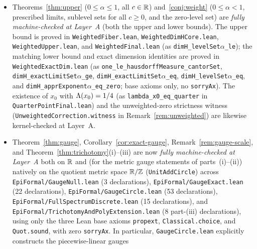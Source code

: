 \begin{itemize}[leftmargin=1.5em]
\texttt{EpiFormal/\allowbreak{}GaugeExact.lean}
(\texttt{volume\_finiteLevel\_zero}, \texttt{ae\_apprExponent\_eq\_top},
\texttt{volume\_infiniteLevel\_Icc}, and
\texttt{dimH\_infiniteLevel\_eq\_one}).
\item Theorems~\ref{thm:upper} ($0\le\alpha\le1$, all $c\in\mathbb{R}$)
and~\ref{conj:weight} ($0\le\alpha<1$, prescribed limits, sublevel sets for all
$c\ge0$, and the zero-level set) are \emph{fully machine-checked at Layer~A}
(both the upper and lower bounds). The upper bound is proved in
\texttt{Weighted\allowbreak Fiber.lean}, \texttt{Weighted\allowbreak DimHCore.lean},
\texttt{Weighted\allowbreak Upper.lean}, and \texttt{Weighted\allowbreak Final.lean}
(as \texttt{dimH\_\allowbreak levelSet\ensuremath{\alpha}\_le}); the
matching lower bound and exact dimension identities are proved in
\texttt{Weighted\allowbreak ExactDim.lean}
(as \texttt{one\_\allowbreak le\_\allowbreak hausdorff\allowbreak Measure\_\allowbreak cantorSet},
\texttt{dimH\_\allowbreak exact\allowbreak LimitSet\ensuremath{\alpha}\_ge},
\texttt{dimH\_\allowbreak exact\allowbreak LimitSet\ensuremath{\alpha}\_eq},
\texttt{dimH\_\allowbreak levelSet\ensuremath{\alpha}\_eq}, and
\texttt{dimH\_\allowbreak appr\allowbreak Exponent\ensuremath{\alpha}\_eq\_\allowbreak zero}; base
axioms only, no \texttt{sorryAx}). The existence of $x_0$ with $\Lambda(x_0)=1/4$
(as \texttt{lambda\_\allowbreak x0\_\allowbreak eq\_\allowbreak quarter} in \texttt{Quarter\allowbreak Point\allowbreak Final.lean}) and the
unweighted-zero strictness witness
(\texttt{Unweighted\allowbreak Correction.\allowbreak witness} in Remark~\ref{rem:unweighted})
are likewise kernel-checked at Layer~A.
\item Theorem~\ref{thm:gauge}, Corollary~\ref{cor:exact-gauge},
Remark~\ref{rem:gauge-scale}, and Theorem~\ref{thm:trichotomy}(i)--(iii) are now
\emph{fully machine-checked at Layer~A} both on $\mathbb{R}$ and (for the metric gauge
statements of parts~(i)--(ii)) natively on the
quotient metric space $\mathbb{R}/\mathbb{Z}$ (\texttt{UnitAddCircle}) across
\texttt{EpiFormal/\allowbreak GaugeNull.lean} (3 declarations),
\texttt{EpiFormal/\allowbreak GaugeExact.lean} (22 declarations),
\texttt{EpiFormal/\allowbreak GaugeCircle.lean} (53 declarations),
\texttt{EpiFormal/\allowbreak FullSpectrumDiscrete.lean} (15 declarations), and
\texttt{EpiFormal/\allowbreak TrichotomyAndPolyExtension.lean} (8 part-(iii)
declarations), using only
the three Lean base axioms \texttt{propext}, \texttt{Classical.choice}, and
\texttt{Quot.sound}, with zero \texttt{sorryAx}. In particular,
\texttt{GaugeCircle.lean} explicitly constructs the piecewise-linear gauges

\end{itemize}
